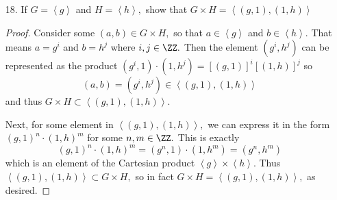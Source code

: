 \documentclass{article}
\begin{document}
\begin{itemize}
\begin{enumerate}[(a)]
\begin{proof}
				\end{proof}
				
		\end{enumerate}

	\item[18.] If $G=\left< g\right>$ and $H=\left< h\right>,$ show that $G\times H=\left< (g, 1), (1, h)\right>$
		\begin{proof}
			Consider some $(a, b)\in G\times H,$ so that $a\in\left< g\right>$ and $b\in\left< h\right>.$ That means $a=g^i$ and $b=h^j$ where $i, j\in \ZZ.$ Then the element $(g^i, h^j)$ can be represented as the product $(g^i, 1)\cdot(1, h^j)= \left[ (g, 1) \right]^i\left[ (1, h) \right]^j$ so \[(a, b)=(g^i, h^j)\in \left< (g, 1), (1, h)\right>\] and thus $G\times H\subset \left< (g, 1), (1, h)\right>.$

			Next, for some element in $\left< (g, 1), (1, h)\right>,$ we can express it in the form $(g, 1)^n\cdot (1, h)^m$ for some $n, m\in \ZZ.$ This is exactly \[(g, 1)^n\cdot(1, h)^m=(g^n, 1)\cdot(1, h^m)=(g^n, h^m)\] which is an element of the Cartesian product $\left< g\right>\times \left< h\right>.$ Thus $\left< (g, 1), (1, h)\right>\subset G\times H,$ so in fact $G\times H=\left< (g, 1), (1, h)\right>,$ as desired.
			
		\end{proof}
		
\end{itemize}
\end{document}
